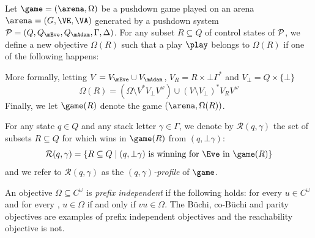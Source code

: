 Let $\game=(\arena,\Omega)$ be a pushdown game played on an arena $\arena = (G,\VE,\VA)$ generated by a pushdown system $\PDS = (Q,Q_{\mEve}, Q_{\mAdam}, \Gamma,\Delta)$. For any subset $R\subseteq Q$ of control states of $\mathcal{P}$, we define a new objective $\Omega(R)$ such that a play $\play$ belongs to $\Omega(R)$ if one of the following happens:


More formally, letting $V=V_\mEve\cup V_\mAdam$, $V_R = R \times \bot \Gamma^*$ and $V_\bot = Q \times \{\bot\}$ 
$$ \Omega(R) = (\Omega \setminus V^*V_\bot V^\omega)\cup (V \setminus V_\bot)^* V_R V^\omega$$
Finally, we let $\game(R)$ denote the game $(\arena,\Omega(R))$.


For any state $q\in Q$ and any stack letter $\gamma\in\Gamma$, we denote by $\mathcal{R}(q,\gamma)$ the set of subsets $R\subseteq Q$ for which \Eve wins in $\game(R)$ from $(q,\bot\gamma)$:
$$\mathcal{R}(q,\gamma)=\{
R\subseteq Q\mid (q,\bot\gamma) \text{ is winning for \Eve in } \game(R)
\}$$ and we refer to $\mathcal{R}(q,\gamma)$ as the \emph{$(q,\gamma)$-profile} of $\game$.

An objective $\Omega\subseteq C^\omega$ is \emph{prefix independent} if the following holds: for every $u\in C^\omega$ and for every ,  $u\in \Omega$ if and only if $vu\in \Omega$. The Büchi, co-Büchi and parity objectives are examples of prefix independent objectives and the reachability objective is not.


